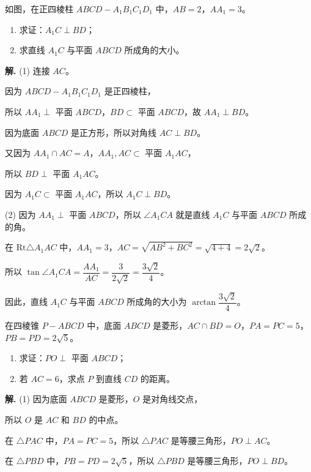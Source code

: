\documentclass[11pt]{ctexrep}
\begin{document}
\begin{realexam}[2024 上海春考]
    如图，在正四棱柱 $ABCD-A_1B_1C_1D_1$ 中，$AB = 2$，$AA_1 = 3$。
    \begin{enumerate}
        \item 求证：$A_1C \perp BD$；
        \item 求直线 $A_1C$ 与平面 $ABCD$ 所成角的大小。
    \end{enumerate}
\end{realexam}

\textbf{解.} (1) 连接 $AC$。

因为 $ABCD-A_1B_1C_1D_1$ 是正四棱柱，

所以 $AA_1 \perp$ 平面 $ABCD$，$BD \subset$ 平面 $ABCD$，故 $AA_1 \perp BD$。

因为底面 $ABCD$ 是正方形，所以对角线 $AC \perp BD$。

又因为 $AA_1 \cap AC = A$，$AA_1, AC \subset$ 平面 $A_1AC$，

所以 $BD \perp$ 平面 $A_1AC$。

因为 $A_1C \subset$ 平面 $A_1AC$，所以 $A_1C \perp BD$。

(2) 因为 $AA_1 \perp$ 平面 $ABCD$，所以 $\angle A_1CA$ 就是直线 $A_1C$ 与平面 $ABCD$ 所成的角。

在 $\text{Rt}\triangle A_1AC$ 中，$AA_1 = 3$，$AC = \sqrt{AB^2 + BC^2} = \sqrt{4 + 4} = 2\sqrt{2}$。

所以 $\tan \angle A_1CA = \dfrac{AA_1}{AC} = \dfrac{3}{2\sqrt{2}} = \dfrac{3\sqrt{2}}{4}$。

因此，直线 $A_1C$ 与平面 $ABCD$ 所成角的大小为 $\arctan \dfrac{3\sqrt{2}}{4}$。

\begin{realexam}[2025 上海虹口二模]
    在四棱锥 $P-ABCD$ 中，底面 $ABCD$ 是菱形，$AC \cap BD = O$，$PA = PC = 5$，$PB = PD = 2\sqrt{5}$。
    \begin{enumerate}
        \item 求证：$PO \perp$ 平面 $ABCD$；
        \item 若 $AC = 6$，求点 $P$ 到直线 $CD$ 的距离。
    \end{enumerate}
\end{realexam}

\textbf{解.} (1) 因为底面 $ABCD$ 是菱形，$O$ 是对角线交点，

所以 $O$ 是 $AC$ 和 $BD$ 的中点。

在 $\triangle PAC$ 中，$PA = PC = 5$，所以 $\triangle PAC$ 是等腰三角形，$PO \perp AC$。

在 $\triangle PBD$ 中，$PB = PD = 2\sqrt{5}$，所以 $\triangle PBD$ 是等腰三角形，$PO \perp BD$。
\end{document}
